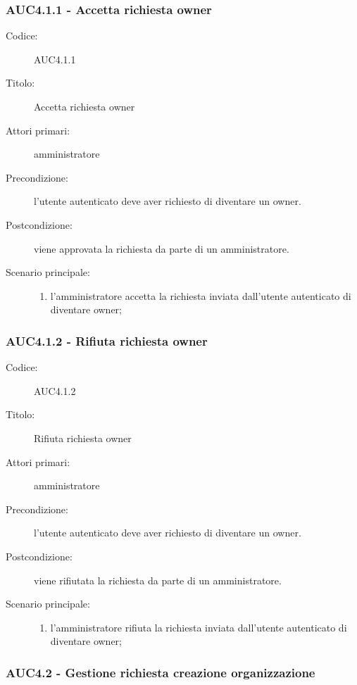 \documentclass[casi-duso]{subfiles}
\begin{document}
\subsubsection{AUC4.1.1 - Accetta richiesta owner}%
\label{subsub:AUC4.1.1}
\begin{description}
  \item[Codice:] AUC4.1.1
  \item[Titolo:] Accetta richiesta owner
  \item[Attori primari:] amministratore
  \item[Precondizione:] l'utente autenticato deve aver richiesto di diventare un owner.
  \item[Postcondizione:] viene approvata la richiesta da parte di un amministratore.
  \item[Scenario principale:]
  \begin{enumerate}
    \item l'amministratore accetta la richiesta inviata dall'utente autenticato di diventare owner;
  \end{enumerate}
\end{description}

\subsubsection{AUC4.1.2 - Rifiuta richiesta owner}%
\label{subsub:AUC4.1.2}
\begin{description}
  \item[Codice:] AUC4.1.2
  \item[Titolo:] Rifiuta richiesta owner
  \item[Attori primari:] amministratore
  \item[Precondizione:] l'utente autenticato deve aver richiesto di diventare un owner.
  \item[Postcondizione:] viene rifiutata la richiesta da parte di un amministratore.
  \item[Scenario principale:]
  \begin{enumerate}
    \item l'amministratore rifiuta la richiesta inviata dall'utente autenticato di diventare owner;
  \end{enumerate}
\end{description}

\subsubsection{AUC4.2 - Gestione richiesta creazione organizzazione}%
\label{subsub:AUC4.2}
\end{document}
